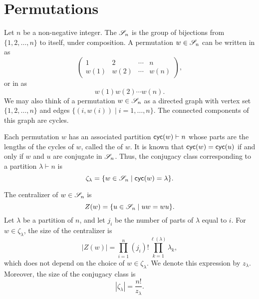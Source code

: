 \chapter{Permutations}

Let \(n\) be a non-negative integer.
The  \(\mathscr{S}_{n}\)
is the group of bijections from \(\{1, 2, \ldots, n\}\) to itself,
under composition.
A permutation \(w \in \mathscr{S}_{n}\) can be written in  as
\begin{equation}
    \begin{pmatrix}
        1    & 2    & \cdots & n    \\
        w(1) & w(2) & \cdots & w(n)
    \end{pmatrix},
\end{equation}
or in  as
\begin{equation}
    w(1)w(2)\cdots w(n).
\end{equation}
We may also think of a permutation \(w \in \mathscr{S}_{n}\) as a directed graph with vertex set \(\{1, 2, \ldots, n\}\) and edges \(\{(i, w(i)) \mid i = 1, \ldots, n\}\).
The connected components of this graph are cycles.

Each permutation \(w\) has an associated partition \(\operatorname{\mathsf{cyc}}(w) \vdash n\) whose parts are the lengths of the cycles of \(w\), called the  of \(w\). It is known that \(\operatorname{\mathsf{cyc}}(w) = \operatorname{\mathsf{cyc}}(u)\) if and only if \(w\) and \(u\) are conjugate in \(\mathscr{S}_{n}\). Thus, the conjugacy class corresponding to a partition \(\lambda \vdash n\) is
\begin{equation}
    \zeta_\lambda = \{ w \in \mathscr{S}_{n} \mid \operatorname{\mathsf{cyc}}(w) = \lambda \}.
\end{equation}

The centralizer of \(w \in \mathscr{S}_{n}\) is
\begin{equation}
    Z(w) = \{ u \in \mathscr{S}_{n} \mid uw = wu \}.
\end{equation}
Let \(\lambda\) be a partition of \(n\), and let \(j_i\) be the number of parts of \(\lambda\) equal to \(i\). For \(w \in \zeta_\lambda\), the size of the centralizer is
\begin{equation}
    |Z(w)| = \prod_{i=1}^n (j_i)! \prod_{k=1}^{\ell(\lambda)} \lambda_k,
\end{equation}
which does not depend on the choice of \(w \in \zeta_\lambda\). We denote this expression by \(z_\lambda\). Moreover, the size of the conjugacy class is
\begin{equation}
    |\zeta_\lambda| = \frac{n!}{z_\lambda}.
\end{equation}

